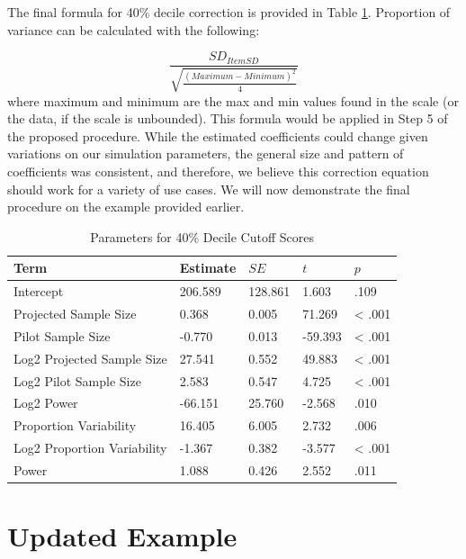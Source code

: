 \documentclass[
  man]{apa7}
\begin{document}
The final formula for 40\% decile correction is provided in Table \ref{tab:table-decile}. Proportion of variance can be calculated with the following:

\[\frac{SD_{Item SD}}{\sqrt{\frac{(Maximum - Minimum)^2}{4}}}\] where maximum and minimum are the max and min values found in the scale (or the data, if the scale is unbounded). This formula would be applied in Step 5 of the proposed procedure. While the estimated coefficients could change given variations on our simulation parameters, the general size and pattern of coefficients was consistent, and therefore, we believe this correction equation should work for a variety of use cases. We will now demonstrate the final procedure on the example provided earlier.

\begin{table}[tbp]

\begin{center}
\begin{threeparttable}

\caption{\label{tab:table-decile}Parameters for 40\% Decile Cutoff Scores}

\begin{tabular}{lllll}
\toprule
Term & Estimate & $SE$ & $t$ & $p$\\
\midrule
Intercept & 206.589 & 128.861 & 1.603 & .109\\
Projected Sample Size & 0.368 & 0.005 & 71.269 & < .001\\
Pilot Sample Size & -0.770 & 0.013 & -59.393 & < .001\\
Log2 Projected Sample Size & 27.541 & 0.552 & 49.883 & < .001\\
Log2 Pilot Sample Size & 2.583 & 0.547 & 4.725 & < .001\\
Log2 Power & -66.151 & 25.760 & -2.568 & .010\\
Proportion Variability & 16.405 & 6.005 & 2.732 & .006\\
Log2 Proportion Variability & -1.367 & 0.382 & -3.577 & < .001\\
Power & 1.088 & 0.426 & 2.552 & .011\\
\bottomrule
\end{tabular}

\end{threeparttable}
\end{center}

\end{table}

\hypertarget{updated-example}{%
\section{Updated Example}\label{updated-example}}
\end{document}
